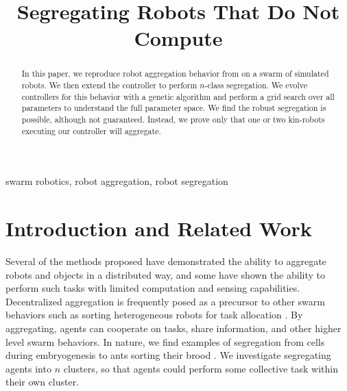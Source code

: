 \documentclass[conference]{IEEEtran}
\begin{document}
\title{Segregating Robots That Do Not Compute}

\author{
\and
{}
\and
{}
}

\maketitle

\begin{abstract}
  In this paper, we reproduce robot aggregation behavior from \cite{gauci_self-organized_2014} on a swarm of simulated robots. We then extend the controller to perform $n$-class segregation. We evolve controllers for this behavior with a genetic algorithm and perform a grid search over all parameters to understand the full parameter space. We find the robust segregation is possible, although not guaranteed. Instead, we prove only that one or two kin-robots executing our controller will aggregate.
\end{abstract}

\begin{IEEEkeywords}
  swarm robotics, robot aggregation, robot segregation
\end{IEEEkeywords}

\section{Introduction and Related Work}
  Several of the methods proposed have demonstrated the ability to aggregate robots and objects in a distributed way, and some have shown the ability to perform such tasks with limited computation and sensing capabilities. Decentralized aggregation is frequently posed as a precursor to other swarm behaviors such as sorting heterogeneous robots for task allocation \cite{gauci_evolving_2014} \cite{dorigo_evolving_2004}. By aggregating, agents can cooperate on tasks, share information, and other higher level swarm behaviors. In nature, we find examples of segregation from cells during embryogenesis to ants sorting their brood \cite{santos_segregation_2014}. We investigate segregating agents into $n$ clusters, so that agents could perform some collective task within their own cluster.
\end{document}
